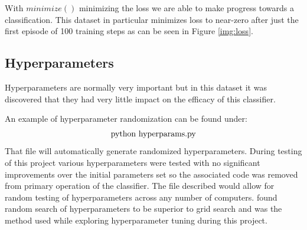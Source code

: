 \documentclass{article}
\begin{document}
    With $minimize()$ minimizing the loss we are able to make progress towards 
    a classification. This dataset in particular minimizes loss to near-zero 
    after just the first episode of 100 training steps as can be seen in Figure 
    \ref{img:loss}.


\subsection{Hyperparameters}\label{sec:hyperparams}
    Hyperparameters are normally very important but in this dataset it was 
    discovered that they had very little impact on the efficacy of 
    this classifier.

    An example of hyperparameter randomization can be found under:
    \[\textnormal{python\ hyperparams.py}\]
    That file will automatically generate randomized hyperparameters. During 
    testing of this project various hyperparameters were tested with no 
    significant improvements over the initial parameters set so the associated 
    code was removed from primary operation of the classifier. The file 
    described would allow for random testing of hyperparameters across any 
    number of computers. \citet{hypparam} found random search of 
    hyperparameters to be superior to grid search and was the method used while 
    exploring hyperparameter tuning during this project.
\end{document}
